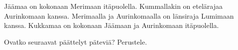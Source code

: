 \begin{tehtava}
    Jäämaa on kokonaan Merimaan itäpuolella.
        Kummallakin on etelärajaa Aurinkomaan kanssa.
        Merimaalla ja Aurinkomaalla on länsiraja Lumimaan kanssa.
        Kukkamaa on kokonaan Jäämaan ja Aurinkomaan itäpuolella.
    \begin{alakohdat}
    \end{alakohdat}

    \begin{vastaus}
        \begin{alakohdat}
        \end{alakohdat}
    \end{vastaus}
    
\end{tehtava}

\begin{tehtava}
    Ovatko seuraavat päättelyt päteviä? Perustele.
    \begin{alakohdat}
    \end{alakohdat}

    \begin{vastaus}
        \begin{alakohdat}
        \end{alakohdat}
    \end{vastaus}
    
\end{tehtava}